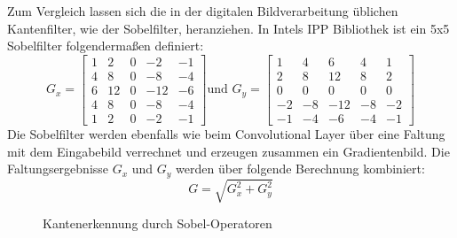 \documentclass[runningheads,a4paper]{llncs}[2015/06/24]
\begin{document}
Zum Vergleich lassen sich die in der digitalen Bildverarbeitung üblichen Kantenfilter, wie der Sobelfilter, heranziehen. In Intels IPP Bibliothek \cite{sobel} ist ein 5x5 Sobelfilter folgendermaßen definiert:
\[ G_{x}=
\begin{bmatrix}
1 & 2 & 0 & -2 & -1 \\
4 & 8 & 0 & -8 & -4 \\
6 & 12 & 0 & -12 & -6 \\
4 & 8 & 0 & -8 & -4 \\
1 & 2 & 0 & -2 & -1 
\end{bmatrix}
\text{und } G_{y}=
\begin{bmatrix}
1 & 4 & 6 & 4 & 1 \\
2 & 8 & 12 & 8 & 2 \\
0 & 0 & 0 & 0 & 0 \\
-2 & -8 & -12 & -8 & -2 \\
-1 & -4 & -6 & -4 & -1 
\end{bmatrix}
\]
Die Sobelfilter werden ebenfalls wie beim Convolutional Layer über eine Faltung mit dem Eingabebild verrechnet und erzeugen zusammen ein Gradientenbild. Die Faltungsergebnisse $G_x$ und $G_y$ werden über folgende Berechnung kombiniert: \[G = \sqrt{G_x^2+G_y^2}\]
\begin{figure}
	\centering
	\caption{Kantenerkennung durch Sobel-Operatoren}
	\label{fig:sobel}
\end{figure}
    
\end{document}
